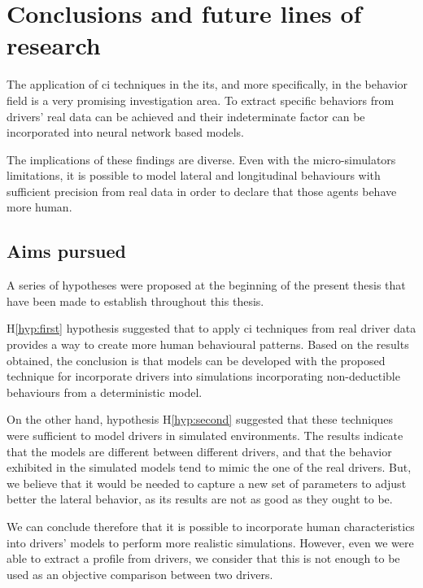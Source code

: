 \chapter{Conclusions and future lines of research}
\label{ch:conclusions-eng}

The application of \acrlong{ci} techniques in the \acrshort{its}, and more specifically, in the behavior field is a very promising investigation area. To extract specific behaviors from drivers’ real data can be achieved and their indeterminate factor can be incorporated into neural network based models.

The implications of these findings are diverse. Even with the micro-simulators limitations, it is possible to model lateral and longitudinal behaviours with sufficient precision from real data in order to declare that those agents behave more human.

\section{Aims pursued}

A series of hypotheses were proposed at the beginning of the present thesis that have been made to establish throughout this thesis.

H\ref{hyp:first} hypothesis suggested that to apply \acrlong{ci} techniques from real driver data provides a way to create more human behavioural patterns. Based on the results obtained, the conclusion is that models can be developed with the proposed technique for incorporate drivers into simulations incorporating non-deductible behaviours from a deterministic model.

On the other hand, hypothesis H\ref{hyp:second} suggested that these techniques were sufficient to model drivers in simulated environments. The results indicate that the models are different between different drivers, and that the behavior exhibited in the simulated models tend to mimic the one of the real drivers. But, we believe that it would be needed to capture a new set of parameters to adjust better the lateral behavior, as its results are not as good as they ought to be.

We can conclude therefore that it is possible to incorporate human characteristics into drivers’ models to perform more realistic simulations. However, even we were able to extract a profile from drivers, we consider that this is not enough to be used as an objective comparison between two drivers.

